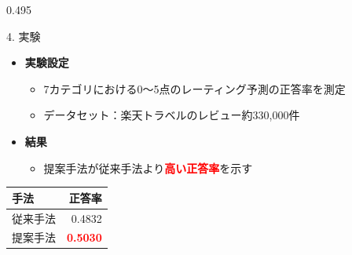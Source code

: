 \documentclass[unicode,10pt]{beamer}
\newcommand{\mycolumnwidth}{0.495\textwidth}
\newcommand{\itemtitle}[1]{\textbf{#1}\\}
\newcommand{\fire}[1]{\textcolor{red}{\textbf{#1}}}
\begin{document}
\begin{frame}
\begin{columns}[onlytextwidth,t]
\begin{column}{\mycolumnwidth}
  \begin{block}{4. 実験}
    \begin{itemize}
      \item \itemtitle{実験設定}
        \begin{itemize}
          \item 7カテゴリにおける0〜5点のレーティング予測の正答率を測定
          \item データセット：楽天トラベルのレビュー約330,000件
        \end{itemize}
    \end{itemize}

    \begin{multicols}{2}
      \begin{itemize}
        \item \itemtitle{結果}
          \begin{itemize}
            \item 提案手法が従来手法より\fire{高い正答率}を示す
          \end{itemize}
      \end{itemize}
      \columnbreak
      \begin{table}
        \centering
        \begin{tabular}{l | r}
          手法 & 正答率 \\
          \hline
          従来手法\cite{fujitani15} & 0.4832 \\
          提案手法 & \fire{0.5030} \\
        \end{tabular}
      \end{table}
    \end{multicols}
  \end{block}


\end{column}
\end{columns}
\end{frame}
\end{document}
